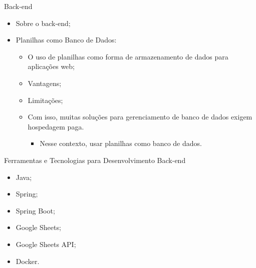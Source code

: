 \begin{frame}{Back-end}
    \begin{itemize}
        \item Sobre o back-end; \vspace{0.25cm}
        \item Planilhas como Banco de Dados: \vspace{0.25cm}
              \begin{itemize}
                  \item O uso de planilhas como forma de armazenamento de dados para aplicações web; \vspace{0.25cm}
                  \item Vantagens; \vspace{0.25cm}
                  \item Limitações; \vspace{0.25cm}
                  \item Com isso, muitas soluções para gerenciamento de banco de dados exigem hospedagem paga. \vspace{0.25cm}
                  \begin{itemize}
                    \item Nesse contexto, usar planilhas como banco de dados.
                  \end{itemize}
              \end{itemize}
    \end{itemize}
\end{frame}

\begin{frame}{Ferramentas e Tecnologias para Desenvolvimento Back-end}
    \begin{itemize}
        \item Java; \vspace{0.5cm}
        \item Spring; \vspace{0.5cm}
        \item Spring Boot; \vspace{0.5cm}
        \item Google Sheets; \vspace{0.5cm}
        \item Google Sheets API; \vspace{0.5cm}
        \item Docker. \vspace{0.5cm}
    \end{itemize}
\end{frame}

